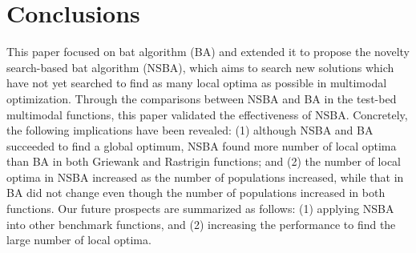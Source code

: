 \documentclass{ies2018}
\begin{document}
\section{Conclusions}
This paper focused on bat algorithm (BA) and extended it to propose the novelty search-based bat algorithm (NSBA), which aims to search new solutions which have not yet searched to find as many local optima as possible in multimodal optimization. Through the comparisons between NSBA and BA in the test-bed multimodal functions, this paper validated the effectiveness of NSBA. Concretely, the following implications have been revealed: (1) although NSBA and BA succeeded to find a global optimum, NSBA found more number of local optima than BA in both Griewank and Rastrigin functions; and (2) the number of local optima in NSBA increased as the number of populations increased, while that in BA did not change even though the number of populations increased in both functions. 
Our future prospects are summarized as follows: (1) applying NSBA into other benchmark functions, and (2) increasing the performance to find the large number of local optima.
\end{document}
